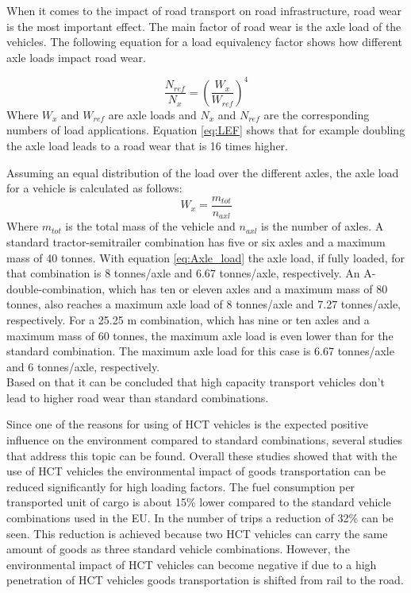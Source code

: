 \documentclass[ExampleMasters.tex]{subfiles}
\begin{document}
When it comes to the impact of road transport on road infrastructure, road wear is the most important effect. The main factor of road wear is the axle load of the vehicles. The following equation for a load equivalency factor shows how different axle loads impact road wear.   

\begin{equation}
\frac{N_{ref}}{N_x}=\left(\frac{W_x}{W_{ref}}\right)^4
\label{eq:LEF}
\end{equation}
Where $W_x$ and $W_{ref}$ are axle loads and $N_x$ and $N_{ref}$ are the corresponding numbers of load applications\cite{road_wear}. Equation \eqref{eq:LEF} shows that for example doubling the axle load leads to a road wear that is 16 times higher.

Assuming an equal distribution of the load over the different axles, the axle load for a vehicle is calculated as follows:\\
\begin{equation}
W_x=\frac{m_{tot}}{n_{axl}}
\label{eq:Axle_load}
\end{equation}
Where $m_{tot}$ is the total mass of the vehicle and $n_{axl}$ is the number of axles.
A standard tractor-semitrailer combination has five or six axles and a maximum mass of 40 tonnes.
With equation \eqref{eq:Axle_load} the axle load, if fully loaded, for that combination is 8 tonnes/axle and 6.67 tonnes/axle, respectively.
An A-double-combination, which has ten or eleven axles and a maximum mass of 80 tonnes, also reaches a maximum axle  load of 8 tonnes/axle and 7.27 tonnes/axle, respectively.
For a 25.25 m combination, which has nine or ten axles and a maximum mass of 60 tonnes, the maximum axle load is even lower than for the standard combination. The maximum axle load for this case is 6.67 tonnes/axle and 6 tonnes/axle, respectively.
\\Based on that it can be concluded that high capacity transport vehicles don't lead to higher road wear than standard combinations.


Since one of the reasons for using of \gls{HCT} vehicles is the expected positive influence on the environment compared to standard combinations, several studies that address this topic can be found.   
Overall these studies showed that with the use of \gls{HCT} vehicles the environmental impact of goods transportation can be reduced significantly for high loading factors. The fuel consumption per transported unit of cargo is about 15\% lower compared to the standard vehicle combinations used in the EU. In the number of trips a reduction of 32\% can be seen. This reduction is achieved because two \gls{HCT} vehicles can carry the same amount of goods as three standard vehicle combinations\cite{backman2002improved}.
However, the environmental impact of \gls{HCT} vehicles can become negative if due to a high penetration of \gls{HCT} vehicles goods transportation is shifted from rail to the road\cite{doll2009long}.
\end{document}
